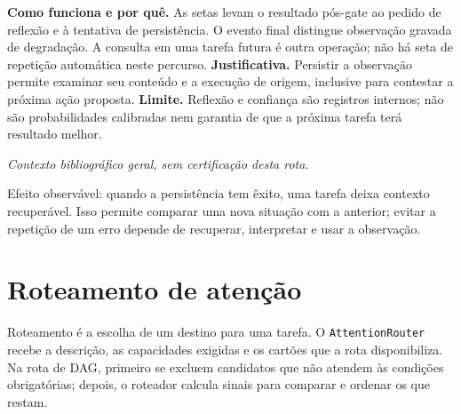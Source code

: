 \begin{descricao}
\textbf{Como funciona e por quê.} As setas levam o resultado pós-gate ao pedido de reflexão e à tentativa de persistência. O evento final distingue observação gravada de degradação. A consulta em uma tarefa futura é outra operação; não há seta de repetição automática neste percurso.
\textbf{Justificativa.} Persistir a observação permite examinar seu conteúdo e
a execução de origem, inclusive para contestar a próxima ação proposta.
\textbf{Limite.} Reflexão e confiança são registros internos; não são probabilidades calibradas nem garantia de que a próxima tarefa terá resultado melhor.
\end{descricao}


\noindent\textit{Contexto bibliográfico geral, sem certificação desta rota.} 


\begin{resultado}
Efeito observável: quando a persistência tem êxito, uma tarefa deixa contexto
recuperável. Isso permite comparar uma nova situação com a anterior; evitar a
repetição de um erro depende de recuperar, interpretar e usar a observação.
\end{resultado}

\clearpage
\section{Roteamento de atenção}


\begin{conceito}
Roteamento é a escolha de um destino para uma tarefa. O
\texttt{AttentionRouter} recebe a descrição, as capacidades exigidas e os
cartões que a rota disponibiliza. Na rota de DAG, primeiro se excluem
candidatos que não atendem às condições obrigatórias; depois, o roteador calcula
sinais para comparar e ordenar os que restam.
\end{conceito}

